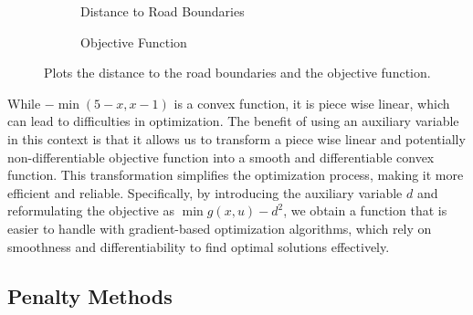 \begin{figure}[H]
	\centering
	\begin{subfigure}{0.48\textwidth}
		\centering
		\caption{Distance to Road Boundaries}
		\label{fig:road_boundaries}
	\end{subfigure}
	\hfill
	\begin{subfigure}{0.48\textwidth}
		\centering
		\caption{Objective Function}
		\label{fig:objective_functions}
	\end{subfigure}
	\caption{Plots the distance to the road boundaries and the objective function.}
	\label{fig:auxiliary_variables}
\end{figure}

While \(-\min(5 - x, x - 1)\) is a convex function, it is piece wise linear, which can lead to difficulties in optimization.
The benefit of using an auxiliary variable in this context is that it allows us to transform a piece wise linear and potentially non-differentiable
objective function into a smooth and differentiable convex function.
This transformation simplifies the optimization process, making it more efficient and reliable.
Specifically, by introducing the auxiliary variable \( d \) and reformulating the objective as \(\min g(x, u) - d^2\), we obtain a function that is
easier to handle with gradient-based optimization algorithms, which rely on smoothness and differentiability to find optimal solutions effectively.

\subsection{Penalty Methods}

